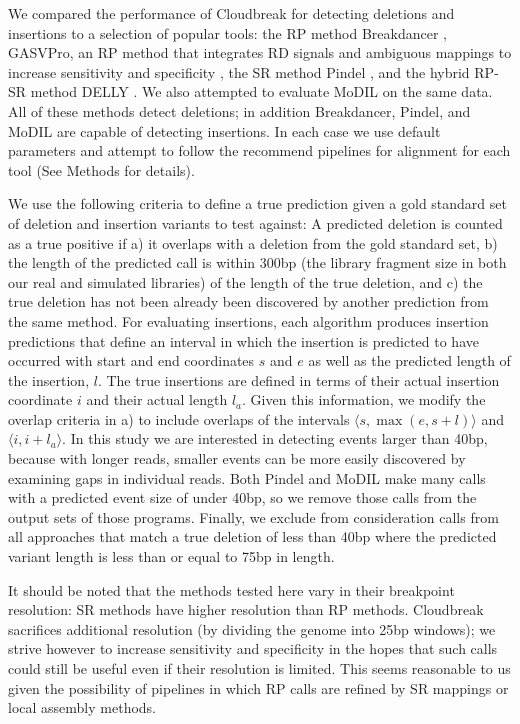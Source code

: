 \documentclass[11pt]{article}
\begin{document}
We compared the performance of Cloudbreak for detecting deletions and insertions to a selection of popular tools: the RP method Breakdancer \autocite{Chen:2009p3}, GASVPro, an RP method that integrates RD signals and ambiguous mappings to increase sensitivity and specificity \autocite{Sindi:2012kk}, the SR method Pindel \autocite{Ye:2009p2}, and the hybrid RP-SR method DELLY \autocite{Rausch:2012he}. We also attempted to evaluate MoDIL on the same data. All of these methods detect deletions; in addition Breakdancer, Pindel, and MoDIL are capable of detecting insertions. In each case we use default parameters and attempt to follow the recommend pipelines for alignment for each tool (See Methods for details).

We use the following criteria to define a true prediction given a gold standard set of deletion and insertion variants to test against: A predicted deletion is counted as a true positive if a) it overlaps with a deletion from the gold standard set, b) the length of the predicted call is within 300bp (the library fragment size in both our real and simulated libraries) of the length of the true deletion, and c) the true deletion has not been already been discovered by another prediction from the same method. For evaluating insertions, each algorithm produces insertion predictions that define an interval in which the insertion is predicted to have occurred with start and end coordinates $s$ and $e$ as well as the predicted length of the insertion, $l$. The true insertions are defined in terms of their actual insertion coordinate $i$ and their actual length $l_a$. Given this information, we modify the overlap criteria in a) to include overlaps of the intervals $\langle s,\max{\left(e,s+l\right)} \rangle$ and $\langle i,i+l_a \rangle$. In this study we are interested in detecting events larger than 40bp, because with longer reads, smaller events can be more easily discovered by examining gaps in individual reads. Both Pindel and MoDIL make many calls with a predicted event size of under 40bp, so we remove those calls from the output sets of those programs. Finally, we exclude from consideration calls from all approaches that match a true deletion of less than 40bp where the predicted variant length is less than or equal to 75bp in length.

It should be noted that the methods tested here vary in their breakpoint resolution: SR methods have higher resolution than RP methods. Cloudbreak sacrifices additional resolution (by dividing the genome into 25bp windows); we strive however to increase sensitivity and specificity in the hopes that such calls could still be useful even if their resolution is limited. This seems reasonable to us given the possibility of pipelines in which RP calls are refined by SR mappings or local assembly methods.
\end{document}
